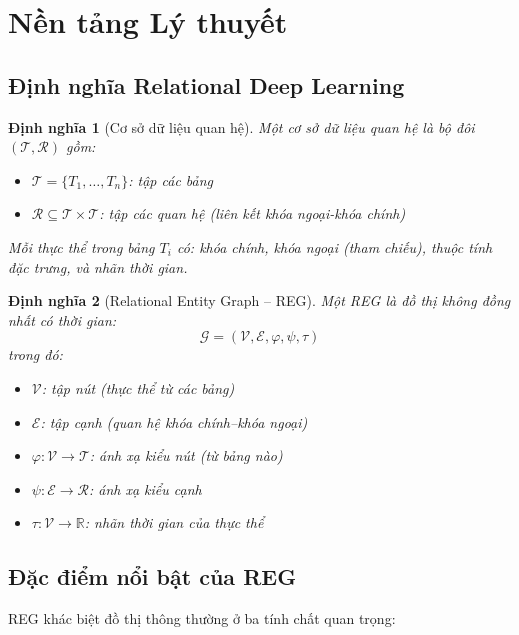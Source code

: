 \documentclass[12pt,a4paper]{article}
\newtheorem{definition}{Định nghĩa}
\begin{document}
\section{Nền tảng Lý thuyết}

\subsection{Định nghĩa Relational Deep Learning}

\begin{definition}[Cơ sở dữ liệu quan hệ]
Một cơ sở dữ liệu quan hệ là bộ đôi $(\mathcal{T}, \mathcal{R})$ gồm:
\begin{itemize}[nosep]
  \item $\mathcal{T} = \{T_1, \ldots, T_n\}$: tập các bảng
  \item $\mathcal{R} \subseteq \mathcal{T} \times \mathcal{T}$: tập các quan hệ
        (liên kết khóa ngoại-khóa chính)
\end{itemize}
Mỗi thực thể trong bảng $T_i$ có: khóa chính, khóa ngoại (tham chiếu), 
thuộc tính đặc trưng, và nhãn thời gian.
\end{definition}

\begin{definition}[Relational Entity Graph -- REG]
Một REG là đồ thị không đồng nhất có thời gian:
\[
  \mathcal{G} = (\mathcal{V}, \mathcal{E}, \varphi, \psi, \tau)
\]
trong đó:
\begin{itemize}[nosep]
  \item $\mathcal{V}$: tập nút (thực thể từ các bảng)
  \item $\mathcal{E}$: tập cạnh (quan hệ khóa chính--khóa ngoại)
  \item $\varphi: \mathcal{V} \to \mathcal{T}$: ánh xạ kiểu nút (từ bảng nào)
  \item $\psi: \mathcal{E} \to \mathcal{R}$: ánh xạ kiểu cạnh
  \item $\tau: \mathcal{V} \to \mathbb{R}$: nhãn thời gian của thực thể
\end{itemize}
\end{definition}

\subsection{Đặc điểm nổi bật của REG}

REG khác biệt đồ thị thông thường ở ba tính chất quan trọng:
\end{document}
